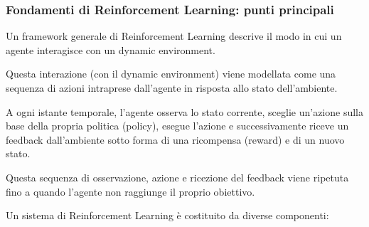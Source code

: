 \newpage

\subsubsection{Fondamenti di Reinforcement Learning: punti principali}

Un framework generale di Reinforcement Learning descrive il modo in cui un agente interagisce con un dynamic environment.

Questa interazione (con il dynamic environment) viene modellata come una sequenza di azioni intraprese dall'agente in risposta allo stato dell'ambiente.

A ogni istante temporale, l'agente osserva lo stato corrente, sceglie un'azione sulla base della propria politica (policy), esegue l'azione e successivamente riceve un feedback dall'ambiente sotto forma di una ricompensa (reward) e di un nuovo stato.

Questa sequenza di osservazione, azione e ricezione del feedback viene ripetuta fino a quando l'agente non raggiunge il proprio obiettivo.

Un sistema di Reinforcement Learning è costituito da diverse componenti:

